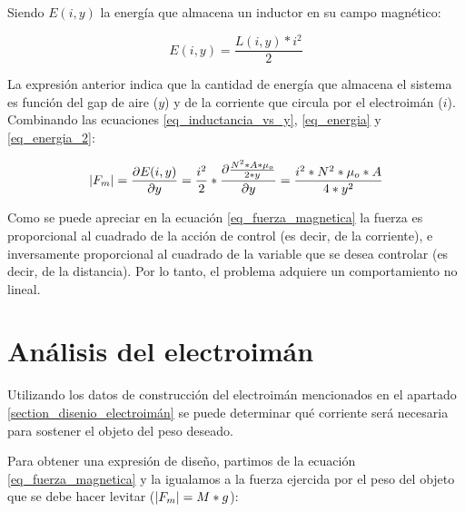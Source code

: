 \noindent Siendo $E(i,y)$ la energía que almacena un inductor en su campo magnético:

\begin{equation}\label{eq_energia_2}
	E(i,y)=\frac{L(i,y)*i^{2}}{2}
\end{equation}

\noindent La expresión anterior indica que la cantidad de energía que almacena el sistema es función del gap de aire ($y$) y de la corriente que circula por el electroimán ($i$). Combinando las ecuaciones \ref{eq_inductancia_vs_y}, \ref{eq_energia} y \ref{eq_energia_2}:

\begin{equation}\label{eq_fuerza_magnetica}
	\lvert F_{m}\rvert=\frac{\partial{E(i,y)}}{\partial{y}}=\frac{i^{2}}{2}*\frac{\partial{\frac{{N^{2}*A*\mu_{o}}}{2*y}}}{\partial{y}}=\frac{i^{2}*N^{2}*\mu_{o}*A}{4*y^{2}}
\end{equation}

\noindent Como se puede apreciar en la ecuación \ref{eq_fuerza_magnetica} la fuerza es proporcional al cuadrado de la acción de control (es decir, de la corriente), e inversamente proporcional al cuadrado de la variable que se desea controlar (es decir, de la distancia). Por lo tanto, el problema adquiere un comportamiento no lineal.


\section{Análisis del electroimán}

\noindent Utilizando los datos de construcción del electroimán mencionados en el apartado \ref{section_disenio_electroimán} se puede determinar qué corriente será necesaria para sostener el objeto del peso deseado.
	


\noindent Para obtener una expresión de diseño, partimos de la ecuación \ref{eq_fuerza_magnetica} y la igualamos a la fuerza ejercida por el peso del objeto que se debe hacer levitar ($\lvert F_{m}\rvert=M*g$):

